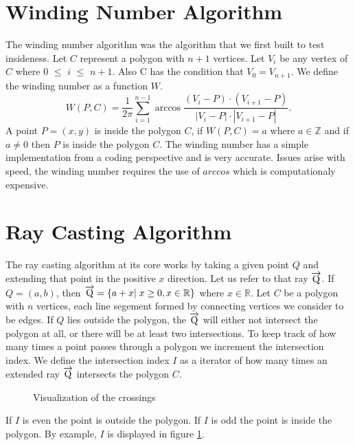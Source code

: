 \documentclass{article}
\begin{document}
\section{Winding Number Algorithm}
The winding number algorithm was the algorithm that we first built to test insideness.
Let $C$ represent a polygon with $n+1$ vertices.
Let $V_i$ be any vertex of $C$ where $0$ $\leq$ $i$ $\leq$ $n+1$.
Also C has the condition that $V_0 = V_{n+1}$.
We define the winding number as a function $W$.
$$
W(P,C) = \frac{1}{2\pi}\sum_{i=1}^{n-1}\arccos{\frac{(V_i-P)\cdot (V_{i+1}-P)}{|V_i-P|\cdot |V_{i+1}-P|}}.
$$
A point $P = (x,y)$ is inside the polygon $C$, if $W(P,C) = a$ where $a \in \mathbb{Z}$ and  if $a \not= 0$ then $P$ is inside the polygon $C$.
The winding number has a simple implementation from a coding perspective and is very accurate.
Issues arise with speed, the winding number requires the use of $arccos$ which is computationaly expensive.

\section{Ray Casting Algorithm}

The ray casting algorithm at its core works by taking a given point $Q$ and extending that point in the positive $x$ direction.
Let us refer  to that ray $\overrightarrow{\rm Q}$.
If $Q = (a,b)$, then $\overrightarrow{\rm Q} = \{ a + x | \; x \geq 0, x \in \mathbb{R} \}$ where $x \in \mathbb{R}$.
Let $C$ be a polygon with $n$ vertices, each line segement formed by connecting vertices we consider to be edges.
If $Q$ lies outside the polygon, the $\overrightarrow{\rm Q}$ will either not intersect the polygon at all, or there will be at least two intersections.
To keep track of how many times a point passes through a polygon we increment the intersection index.
We define the intersection index $I$ as a iterator of how many times an extended ray $\overrightarrow{\rm Q}$ intersects the polygon $C$.
\FloatBarrier
\begin{figure}[!h]
	  \vspace{0in}
	  \caption{\label{fig:raycasting} Visualization of the crossings}
\end{figure}
\FloatBarrier
If $I$ is even the point is outside the polygon.
If $I$ is odd the point is inside the polygon.
By example, $I$ is displayed in figure \ref{fig:raycasting}.
\end{document}
